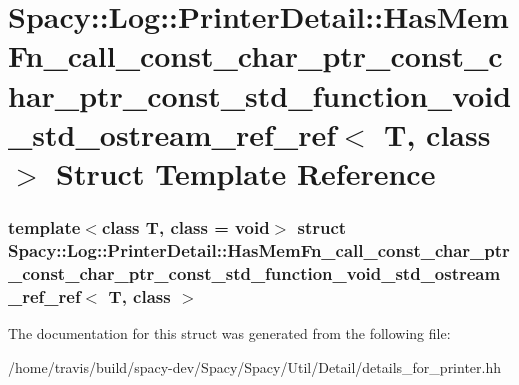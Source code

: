 \hypertarget{structSpacy_1_1Log_1_1PrinterDetail_1_1HasMemFn__call__const__char__ptr__const__char__ptr__const15cb596ceacd53a5d68bf5f34ab16733}{\section{\-Spacy\-:\-:\-Log\-:\-:\-Printer\-Detail\-:\-:\-Has\-Mem\-Fn\-\_\-call\-\_\-const\-\_\-char\-\_\-ptr\-\_\-const\-\_\-char\-\_\-ptr\-\_\-const\-\_\-std\-\_\-function\-\_\-void\-\_\-std\-\_\-ostream\-\_\-ref\-\_\-ref$<$ \-T, class $>$ \-Struct \-Template \-Reference}
\label{structSpacy_1_1Log_1_1PrinterDetail_1_1HasMemFn__call__const__char__ptr__const__char__ptr__const15cb596ceacd53a5d68bf5f34ab16733}
}
\subsubsection*{template$<$class T, class = void$>$ struct Spacy\-::\-Log\-::\-Printer\-Detail\-::\-Has\-Mem\-Fn\-\_\-call\-\_\-const\-\_\-char\-\_\-ptr\-\_\-const\-\_\-char\-\_\-ptr\-\_\-const\-\_\-std\-\_\-function\-\_\-void\-\_\-std\-\_\-ostream\-\_\-ref\-\_\-ref$<$ T, class $>$}



\-The documentation for this struct was generated from the following file\-:\begin{DoxyCompactItemize}
\item 
/home/travis/build/spacy-\/dev/\-Spacy/\-Spacy/\-Util/\-Detail/details\-\_\-for\-\_\-printer.\-hh\end{DoxyCompactItemize}
